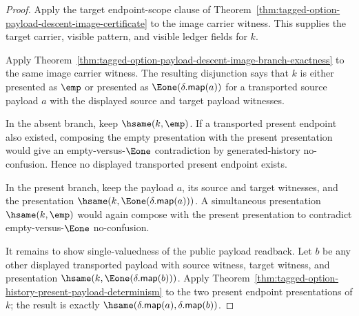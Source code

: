 \begin{proof}
Apply the target endpoint-scope clause of
Theorem~\ref{thm:tagged-option-payload-descent-image-certificate} to the image
carrier witness. This supplies the target carrier, visible pattern, and visible
ledger fields for $k$.

Apply
Theorem~\ref{thm:tagged-option-payload-descent-image-branch-exactness} to the
same image carrier witness. The resulting disjunction says that $k$ is either
presented as $\emp$ or presented as $\Eone(\delta.\mathsf{map}(a))$ for a
transported source payload $a$ with the displayed source and target payload
witnesses.

In the absent branch, keep $\hsame(k,\emp)$. If a transported present endpoint
also existed, composing the empty presentation with the present presentation
would give an empty-versus-$\Eone$ contradiction by generated-history
no-confusion. Hence no displayed transported present endpoint exists.

In the present branch, keep the payload $a$, its source and target witnesses,
and the presentation $\hsame(k,\Eone(\delta.\mathsf{map}(a)))$. A simultaneous
presentation $\hsame(k,\emp)$ would again compose with the present presentation
to contradict empty-versus-$\Eone$ no-confusion.

It remains to show single-valuedness of the public payload readback. Let $b$ be
any other displayed transported payload with source witness, target witness, and
presentation $\hsame(k,\Eone(\delta.\mathsf{map}(b)))$. Apply
Theorem~\ref{thm:tagged-option-history-present-payload-determinism} to the two
present endpoint presentations of $k$; the result is exactly
$\hsame(\delta.\mathsf{map}(a),\delta.\mathsf{map}(b))$.
\end{proof}

